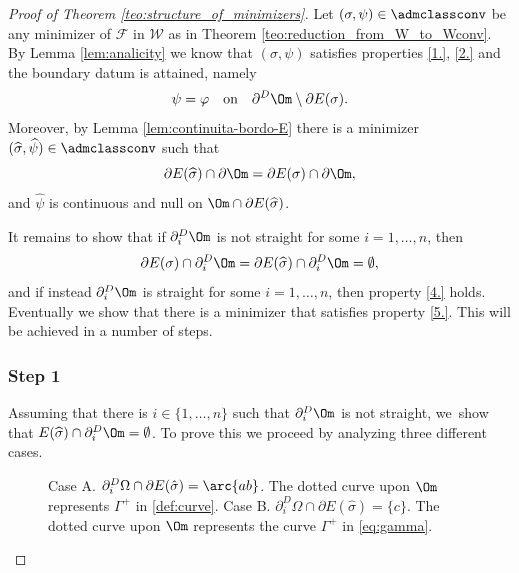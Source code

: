 \begin{proof}[Proof of Theorem \ref{teo:structure_of_minimizers}]
Let $(\sigma,\psi)\in\admclassconv$ be any minimizer of $\mathcal F$ in $\mathcal W$ as in Theorem \ref{teo:reduction_from_W_to_Wconv}.
By Lemma \ref{lem:analicity} we know that $(\sigma,\psi)$ satisfies properties \ref{1.}, \ref{2.} and the boundary datum is attained, namely
\begin{equation*}
\psi=\varphi\quad\text{on}\quad\partial^D\Om\setminus\partial E(\sigma).
\end{equation*}
Moreover, by Lemma \ref{lem:continuita-bordo-E} there is a minimizer $(\widehat\sigma,\widehat\psi)\in\admclassconv$ such that
\begin{equation}\label{eq:prop1}
\partial E(\widehat{\sigma})\cap\partial\Om= \partial E(\sigma)\cap\partial\Om,
\end{equation}
and $\widehat\psi$ is continuous and null on $\Om\cap\partial E(\widehat\sigma)$.

It remains to show that if $\partial^D_i\Om$ is not straight for some $i=1,
\dots,n$, then
\[
\partial E(\sigma)\cap\partial^D_i\Om=\partial E(\widehat\sigma)\cap\partial^D_i\Om=\emptyset,
\]
and if instead $\partial^D_i\Om$ is straight for some $i=1,\dots,n$, then property \ref{4.} holds.
Eventually we show that there is a minimizer that satisfies property \ref{5.}.
This will be achieved in a number of steps.

\subsubsection*{Step 1} Assuming that there is $i\in\{1,\dots,n\}$ such that $\partial_i^D\Om$ is not straight, we~show that $E(\widehat\sigma)\cap\partial_i^D\Om=\emptyset$. To prove this we proceed by analyzing three different cases.

\begin{figure}
\centering
\def\svgwidth{0.9\textwidth}

\caption{Case A. $\partial_i^D\Omega\cap\partial E(\hat\sigma)=\arc{ab}$. The
dotted curve upon $\Om$ represents $\Gamma^+$ in \eqref{def:curve}.
Case B. $\partial_i^D\Omega\cap\partial E(\hat\sigma)=\{c\}$. The dotted curve upon $\Om$ represents the curve $\Gamma^+$ in \eqref{eq:gamma}.
}\label{caseA-caseB}
\end{figure}


\end{proof}

